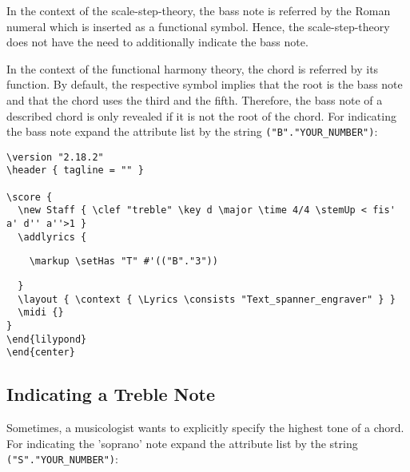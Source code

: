 \documentclass[
  DIV=calc,
  BCOR=5mm,
  12pt,
  headings=small,
  oneside,
  abstract=true,
  toc=bib,
  xcolor=dvipsnames,
  openany,
  english]{scrartcl}
\begin{document}
In the context of the scale-step-theory, the bass note is referred by the Roman
numeral which is inserted as a functional symbol. Hence, the  scale-step-theory
does not have the need to additionally indicate the bass note.

In the context of the functional harmony theory, the chord is referred by its
function. By default, the respective symbol implies that the root is the bass
note and that the chord uses the third and the fifth. Therefore, the bass note
of a described chord is only revealed if it is not the root of the chord. For
indicating the bass note expand the attribute list by the
string \texttt{("B"."YOUR\_NUMBER")}:

\begin{center}
\end{center}

\begin{scriptsize}
\begin{verbatim}
\version "2.18.2"
\header { tagline = "" }

\score {
  \new Staff { \clef "treble" \key d \major \time 4/4 \stemUp < fis' a' d'' a''>1 }
  \addlyrics {
\end{verbatim}
{ \color{red} \verb|    \markup \setHas "T" #'(("B"."3"))| }
\begin{verbatim}
  }
  \layout { \context { \Lyrics \consists "Text_spanner_engraver" } }
  \midi {}
}
\end{lilypond}
\end{center}
\end{verbatim}
\end{scriptsize}

\subsection{Indicating a Treble Note}

Sometimes, a musicologist wants to explicitly specify the highest tone of a
chord. For indicating the 'soprano' note expand the attribute list by the string
\texttt{("S"."YOUR\_NUMBER")}:
\begin{center}
\end{center}
\end{document}
